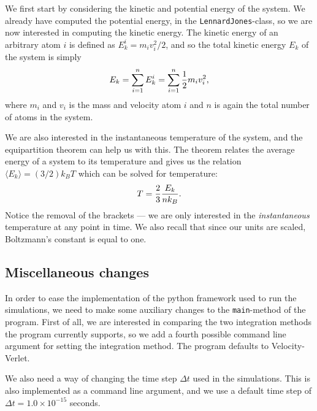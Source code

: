 \documentclass[a4paper]{article}
\begin{document}
    We first start by considering the kinetic and potential energy of the
    system. We already have computed the potential energy, in the
    \texttt{LennardJones}-class, so we are now interested in computing the
    kinetic energy. The kinetic energy of an arbitrary atom $i$ is defined as
    $E_{k}^i = m_iv_i^2/2$, and so the total kinetic energy $E_k$ of the system
    is simply
    \begin{equation}
        \notag
        E_k = \sum^{n}_{i=1} E_k^i = \sum^{n}_{i=1} \frac{1}{2}m_iv_i^2,
    \end{equation}
    where $m_i$ and $v_i$ is the mass and velocity atom $i$ and $n$ is again
    the total number of atoms in the system.
    
    We are also interested in the instantaneous temperature of the system, and
    the equipartition theorem \cite{equipar} can help us with this. The theorem
    relates the average energy of a system to its temperature and gives us the
    relation $\langle E_k \rangle = (3/2)k_BT$ which can be solved for
    temperature:
    \begin{equation}
        \notag
        T = \frac{2}{3} \frac{E_k}{nk_B}.
    \end{equation}
    Notice the removal of the brackets --- we are only interested in the
    \emph{instantaneous} temperature at any point in time. We also recall that
    since our units are scaled, Boltzmann's constant is equal to one.
    
    \subsection{Miscellaneous changes}
    \label{sub:miscellaneous_changes}
    
    In order to ease the implementation of the python framework used to run the
    simulations, we need to make some auxiliary changes to the
    \texttt{main}-method of the program. First of all, we are interested in
    comparing the two integration methods the program currently supports, so we
    add a fourth possible command line argument for setting the integration
    method. The program defaults to Velocity-Verlet.  
    
    We also need a way of changing the time step $\Delta t$ used in the
    simulations. This is also implemented as a command line argument, and we
    use a default time step of $\Delta t = 1.0 \times 10^{-15}$ seconds.
    
\end{document}
